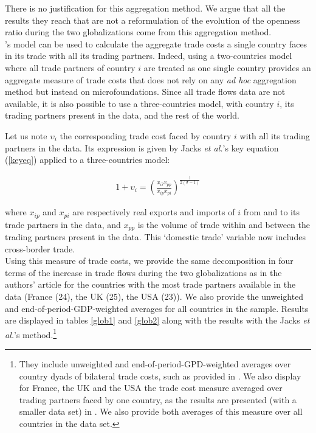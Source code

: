 \documentclass{article}
\begin{document}
There is no justification for this aggregation method. We argue that
all the results they reach that are not a reformulation of the
evolution of the openness ratio during the two
globalizations come from this aggregation method.\\

\cite{AW2003}'s model can be used to calculate the aggregate
trade costs a single country faces in its trade with all
its trading partners. Indeed, using a two-countries model where
all trade partners of country $i$ are treated as one single
country provides an aggregate measure of trade costs that does
not rely on any \textit{ad hoc} aggregation method but instead on
microfoundations. Since all trade flows data are not available,
it is also possible to use a three-countries model, with
country $i$, its trading partners present in the data, and the
rest of the world.

Let us note $\upsilon_{i}$ the corresponding trade cost faced
by country $i$ with all its trading partners in the data. Its
expression is given by Jacks \textit{et al.}'s key equation
(\ref{keyeq}) applied to a three-countries model:

\begin{eqnarray}
1+\upsilon_{i}=\left(\frac{x_{ii} x_{pp}}{x_{ip}
x_{pi}}\right)^{\frac{1}{2(\sigma-1)}} \label{keyeq3model}
\end{eqnarray}

where $x_{ip}$ and $x_{pi}$ are respectively real exports and
imports of $i$ from and to its trade partners in the data, and
$x_{pp}$ is the volume of trade within and between the trading
partners present in the data. This `domestic trade' variable
now
includes cross-border trade.\\

Using this measure of trade costs, we provide the same
decomposition in four terms of the increase in trade flows
during the two globalizations as in the authors' article for
the countries with the most trade partners available in the
data (France (24), the UK (25), the USA (23)). We also provide
the unweighted and end-of-period-GDP-weighted averages for all
countries in the sample. Results are displayed in tables
\ref{glob1} and \ref{glob2} along with the results with the
Jacks \textit{et al.}'s method.\footnote{They include unweighted and
end-of-period-GPD-weighted averages over country dyads of
bilateral trade costs, such as provided in \cite{JMN2011}. We
also display for France, the UK and the USA the trade cost
measure averaged over trading partners faced by one country, as
the results are presented (with a smaller data set) in
\cite{JMN2008, JMN2010}. We also provide both averages of this
measure over all countries in the data set.}\\
\end{document}
